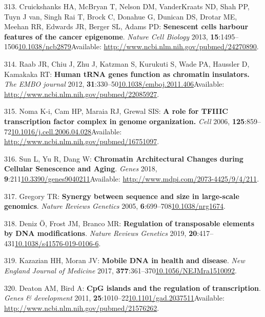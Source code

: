 \documentclass[
]{book}
\begin{document}
\leavevmode\hypertarget{ref-Cruickshanks2013}{}%
313. Cruickshanks HA, McBryan T, Nelson DM, VanderKraats ND, Shah PP, Tuyn J van, Singh Rai T, Brock C, Donahue G, Dunican DS, Drotar ME, Meehan RR, Edwards JR, Berger SL, Adams PD: \textbf{Senescent cells harbour features of the cancer epigenome}. \emph{Nature Cell Biology} 2013, \textbf{15}:1495--1506\href{https://doi.org/10.1038/ncb2879}{10.1038/ncb2879}Available: \url{http://www.ncbi.nlm.nih.gov/pubmed/24270890}.

\leavevmode\hypertarget{ref-Raab2011}{}%
314. Raab JR, Chiu J, Zhu J, Katzman S, Kurukuti S, Wade PA, Haussler D, Kamakaka RT: \textbf{Human tRNA genes function as chromatin insulators.} \emph{The EMBO journal} 2012, \textbf{31}:330--50\href{https://doi.org/10.1038/emboj.2011.406}{10.1038/emboj.2011.406}Available: \url{http://www.ncbi.nlm.nih.gov/pubmed/22085927}.

\leavevmode\hypertarget{ref-Noma2006}{}%
315. Noma K-i, Cam HP, Maraia RJ, Grewal SIS: \textbf{A role for TFIIIC transcription factor complex in genome organization.} \emph{Cell} 2006, \textbf{125}:859--72\href{https://doi.org/10.1016/j.cell.2006.04.028}{10.1016/j.cell.2006.04.028}Available: \url{http://www.ncbi.nlm.nih.gov/pubmed/16751097}.

\leavevmode\hypertarget{ref-Sun2018}{}%
316. Sun L, Yu R, Dang W: \textbf{Chromatin Architectural Changes during Cellular Senescence and Aging}. \emph{Genes} 2018, \textbf{9}:211\href{https://doi.org/10.3390/genes9040211}{10.3390/genes9040211}Available: \url{http://www.mdpi.com/2073-4425/9/4/211}.

\leavevmode\hypertarget{ref-Gregory2005}{}%
317. Gregory TR: \textbf{Synergy between sequence and size in large-scale genomics}. \emph{Nature Reviews Genetics} 2005, \textbf{6}:699--708\href{https://doi.org/10.1038/nrg1674}{10.1038/nrg1674}.

\leavevmode\hypertarget{ref-Deniz2019}{}%
318. Deniz Ö, Frost JM, Branco MR: \textbf{Regulation of transposable elements by DNA modifications}. \emph{Nature Reviews Genetics} 2019, \textbf{20}:417--431\href{https://doi.org/10.1038/s41576-019-0106-6}{10.1038/s41576-019-0106-6}.

\leavevmode\hypertarget{ref-Kazazian2017}{}%
319. Kazazian HH, Moran JV: \textbf{Mobile DNA in health and disease}. \emph{New England Journal of Medicine} 2017, \textbf{377}:361--370\href{https://doi.org/10.1056/NEJMra1510092}{10.1056/NEJMra1510092}.

\leavevmode\hypertarget{ref-Deaton2011}{}%
320. Deaton AM, Bird A: \textbf{CpG islands and the regulation of transcription}. \emph{Genes \& development} 2011, \textbf{25}:1010--22\href{https://doi.org/10.1101/gad.2037511}{10.1101/gad.2037511}Available: \url{http://www.ncbi.nlm.nih.gov/pubmed/21576262}.
\end{document}
